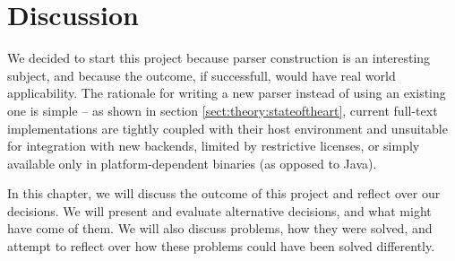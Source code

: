 \chapter{Discussion}
\label{chapter:discussion}
We decided to start this project because parser construction is an interesting
subject, and because the outcome, if successfull, would have real world
applicability. The rationale for writing a new parser instead of using an
existing one is simple -- as shown in section \ref{sect:theory:stateoftheart},
current full-text implementations are tightly coupled with their
host environment and unsuitable for integration with new backends, limited by
restrictive licenses, or simply available only in platform-dependent binaries
(as opposed to Java). 

In this chapter, we will discuss the outcome of this project and reflect over
our decisions. We will present and evaluate alternative decisions, and what
might have come of them. We will also discuss problems, how they were
solved, and attempt to reflect over how these problems could have been solved
differently.
























